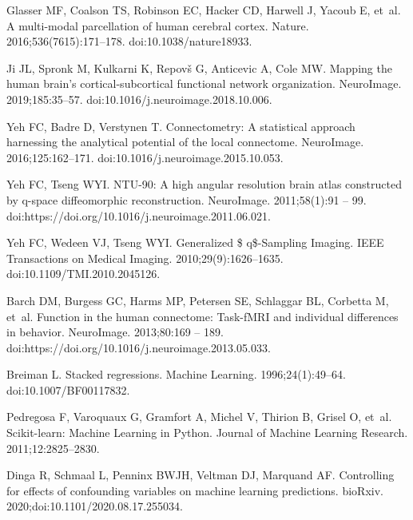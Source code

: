 \documentclass[10pt,letterpaper]{article}
\begin{document}
\begin{thebibliography}{10}
Glasser MF, Coalson TS, Robinson EC, Hacker CD, Harwell J, Yacoub E, et~al.
\newblock A multi-modal parcellation of human cerebral cortex.
\newblock Nature. 2016;536(7615):171--178.
\newblock doi:{10.1038/nature18933}.

Ji JL, Spronk M, Kulkarni K, Repovš G, Anticevic A, Cole MW.
\newblock Mapping the human brain's cortical-subcortical functional network
  organization.
\newblock NeuroImage. 2019;185:35--57.
\newblock doi:{10.1016/j.neuroimage.2018.10.006}.

Yeh FC, Badre D, Verstynen T.
\newblock Connectometry: {A} statistical approach harnessing the analytical
  potential of the local connectome.
\newblock NeuroImage. 2016;125:162--171.
\newblock doi:{10.1016/j.neuroimage.2015.10.053}.

Yeh FC, Tseng WYI.
\newblock NTU-90: A high angular resolution brain atlas constructed by q-space
  diffeomorphic reconstruction.
\newblock NeuroImage. 2011;58(1):91 -- 99.
\newblock doi:{https://doi.org/10.1016/j.neuroimage.2011.06.021}.

Yeh FC, Wedeen VJ, Tseng WYI.
\newblock Generalized \$ q\$-{Sampling} {Imaging}.
\newblock IEEE Transactions on Medical Imaging. 2010;29(9):1626--1635.
\newblock doi:{10.1109/TMI.2010.2045126}.

Barch DM, Burgess GC, Harms MP, Petersen SE, Schlaggar BL, Corbetta M, et~al.
\newblock Function in the human connectome: Task-fMRI and individual
  differences in behavior.
\newblock NeuroImage. 2013;80:169 -- 189.
\newblock doi:{https://doi.org/10.1016/j.neuroimage.2013.05.033}.

Breiman L.
\newblock Stacked regressions.
\newblock Machine Learning. 1996;24(1):49--64.
\newblock doi:{10.1007/BF00117832}.

Pedregosa F, Varoquaux G, Gramfort A, Michel V, Thirion B, Grisel O, et~al.
\newblock Scikit-learn: Machine Learning in {P}ython.
\newblock Journal of Machine Learning Research. 2011;12:2825--2830.

Dinga R, Schmaal L, Penninx BWJH, Veltman DJ, Marquand AF.
\newblock Controlling for effects of confounding variables on machine learning
  predictions.
\newblock bioRxiv. 2020;doi:{10.1101/2020.08.17.255034}.

\end{thebibliography}
\end{document}
